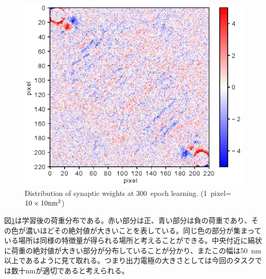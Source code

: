 \documentclass[a4j, twocolumn]{jsarticle}
\begin{document}
\begin{figure}
\centering
\includegraphics[width=1\hsize]{./figures/meanweightsinsqr128_32i_l_hilsinsqr128_32i_t_hil_timesequence_epoch300_batchsize32_mask10_eta30_transition0.eps} 
\caption{Distribution of synaptic weights at 300~epoch learning. (1~pixel=$10\times10 \rm{nm^2}$)}
\label{fig:weightsinsqr128_32i}
\end{figure}

図\ref{fig:weightsinsqr128_32i}は学習後の荷重分布である。赤い部分は正、青い部分は負の荷重であり、その色が濃いほどその絶対値が大きいことを表している。同じ色の部分が集まっている場所は同様の特徴量が得られる場所と考えることができる。中央付近に縞状に荷重の絶対値が大きい部分が分布していることが分かり、またこの幅は50~nm以上であるように見て取れる。つまり出力電極の大きさとしては今回のタスクでは数十nmが適切であると考えられる。
\end{document}

